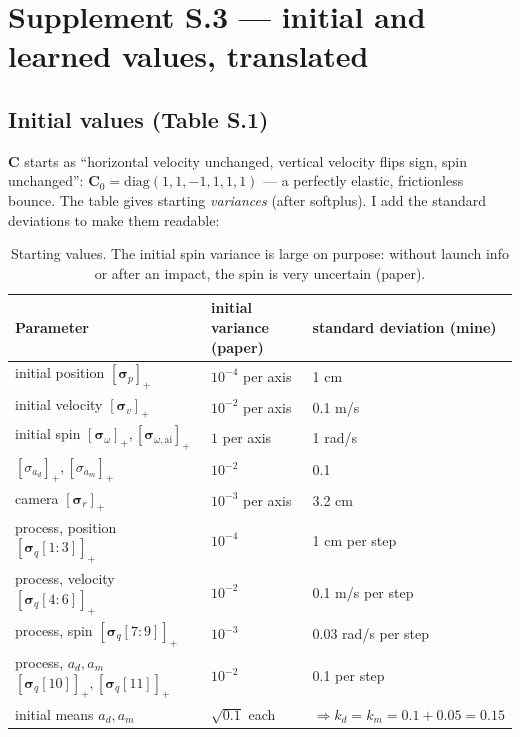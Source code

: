 \documentclass[11pt,a4paper]{article}
\newcommand{\splus}[1]{[#1]_+}
\begin{document}
\section{Supplement S.3 --- initial and learned values, translated}
\subsection{Initial values (Table S.1)}
$\mathbf C$ starts as ``horizontal velocity unchanged, vertical velocity flips sign, spin unchanged'': $\mathbf C_0=\mathrm{diag}(1,1,-1,1,1,1)$ --- a perfectly elastic, frictionless bounce.
The table gives starting \emph{variances} (after softplus). I add the standard deviations to make them readable:
\begin{table}[htbp]
\centering\small\renewcommand{\arraystretch}{1.2}
\begin{tabular}{@{}lll@{}}
\toprule
Parameter & initial variance (paper) & standard deviation (mine)\\
\midrule
initial position $\splus{\boldsymbol\sigma_p}$ & $10^{-4}$ per axis & 1 cm\\
initial velocity $\splus{\boldsymbol\sigma_v}$ & $10^{-2}$ per axis & 0.1 m/s\\
initial spin $\splus{\boldsymbol\sigma_\omega},\splus{\boldsymbol\sigma_{\omega,\text{ai}}}$ & $1$ per axis & 1 rad/s\\
$\splus{\sigma_{a_d}},\splus{\sigma_{a_m}}$ & $10^{-2}$ & 0.1\\
camera $\splus{\boldsymbol\sigma_r}$ & $10^{-3}$ per axis & 3.2 cm\\
process, position $\splus{\boldsymbol\sigma_q[1{:}3]}$ & $10^{-4}$ & 1 cm per step\\
process, velocity $\splus{\boldsymbol\sigma_q[4{:}6]}$ & $10^{-2}$ & 0.1 m/s per step\\
process, spin $\splus{\boldsymbol\sigma_q[7{:}9]}$ & $10^{-3}$ & 0.03 rad/s per step\\
process, $a_d,a_m$ $\splus{\boldsymbol\sigma_q[10]},\splus{\boldsymbol\sigma_q[11]}$ & $10^{-2}$ & 0.1 per step\\
initial means $a_d,a_m$ & $\sqrt{0.1}$ each & $\Rightarrow k_d=k_m=0.1+0.05=0.15$\\
\bottomrule
\end{tabular}
\caption{Starting values. The initial spin variance is large on purpose: without launch info or after an impact, the spin is very uncertain (paper).}
\end{table}
\end{document}
